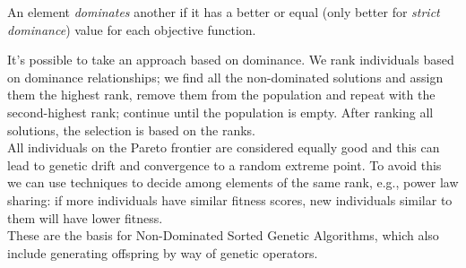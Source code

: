 \begin{definition}
	An element \textit{dominates} another if it has a better or equal (only better for \textit{strict dominance}) value for each objective function.\\
\end{definition}

It's possible to take an approach based on dominance. We rank individuals based on dominance relationships; we find all the non-dominated solutions and assign them the highest rank, remove them from the population and repeat with the second-highest rank; continue until the population is empty. After ranking all solutions, the selection is based on the ranks.\\

All individuals on the Pareto frontier are considered equally good and this can lead to genetic drift and convergence to a random extreme point. To avoid this we can use techniques to decide among elements of the same rank, e.g., power law sharing: if more individuals have similar fitness scores, new individuals similar to them will have lower fitness.\\

These are the basis for Non-Dominated Sorted Genetic Algorithms, which also include generating offspring by way of genetic operators.\\





